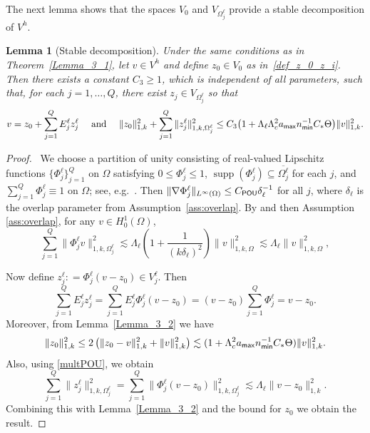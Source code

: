 \documentclass[numbers,webpdf,imaiai]{ima-authoring-template}%
\theoremstyle{thmstyletwo}%
\newtheorem{lemma}[theorem]{Lemma}
\numberwithin{equation}{section}
\newcommand{\CPOU}{C_{\textup{\textsf{POU}}}}
\newcommand{\Cstar}{C_{\ast}}
\newcommand{\assign}{\mathrel{\mathop:}=}
\numberwithin{equation}{section}
\DeclareMathOperator{\supp}{supp}
\newcommand{\amax}{a_{\textup{\textsf{max}}}}
\newcommand{\nmin}{n_{\textup{\textsf{min}}}}
\begin{document}
{The next lemma shows that the spaces $V_0$ and $V_{\Omega_j^\ell}$ provide a stable decomposition of $V^h$.

\begin{lemma}[Stable decomposition]
\label{lemma_3_3}
Under the same conditions as in Theorem~\ref{Lemma_3_1}, let $v \in V^h$ and define $z_0 \in V_0$ as in~\eqref{def_z_0_z_i}. 
Then there exists a constant $C_3\ge1$, which is independent of all parameters, such that,
for each $j = 1,\ldots,Q$, there exist $z_j \in V_{\Omega_j^\ell}$ so that
\[
	v = z_0 + \sum_{j=1}^Q E_j^\ell z_j^\ell \quad \text{ and } \quad \|z_0\|_{1,k}^2 + \sum_{j=1}^Q \|z_j^\ell\|_{1,k,\Omega^\ell_j}^2 
	\le C_3 \bigl(1 + \Lambda_\ell \Lambda_c^2 \amax \nmin^{-1} \Cstar \Theta \bigr) \| v \|_{1,k}^2.
\]
\end{lemma}

\begin{proof}\,
We choose a partition of unity consisting of real-valued Lipschitz functions $\{\Phi_j^{\ell}\}_{j=1}^Q$ on $\Omega$  
satisfying $0 \le \Phi_j^{\ell} \le 1$, $\supp(\Phi_j^{\ell}) \subseteq \overline{\Omega_j^\ell}$ for each $j$,
and $\sum_{j=1}^Q \Phi_j^{\ell} \equiv 1$ on $\Omega$; see, e.g.\ \cite[\S 3.2]{Toselli:2005:DDM}. 
Then $\|\nabla \Phi_j^{\ell}\|_{L^\infty(\Omega)} \le \CPOU \delta_\ell^{-1}$ for all $j$,
where $\delta_\ell$ is the overlap parameter from Assumption~\ref{ass:overlap}. 
By \cite[estimate (3.2)]{Graham:2020:DDI} and then Assumption \ref{ass:overlap}, for any $v \in H^1_0(\Omega)$,
\begin{equation}\label{multPOU}
	\sum_{j=1}^Q \| \Phi_j^{\ell} v \|_{1,k,\Omega_j^\ell}^2 
	\lesssim \Lambda_\ell \left(1 + \frac{1}{(k{\delta_\ell})^2} \right) \|v\|_{1,k,\Omega}^2 \lesssim \Lambda_\ell  \|v\|_{1,k,\Omega}^2,
\end{equation}


Now define $z_j^\ell \assign \Phi_j^\ell(v - z_0) \in V_j^\ell$.  Then 
\[
	\sum_{j=1}^Q E_j^\ell z_j^\ell = \sum_{j=1}^Q E_j^\ell \Phi_j^\ell (v - z_0) = (v - z_0)\sum_{j=1}^Q {\Phi_j^\ell} = v - z_0. 
\]
Moreover, from Lemma~\ref{Lemma_3_2} we have 
\[
	\|z_0\|_{1,k}^2 \le 2\left(\|z_0 - v\|_{1,k}^2 + \|v\|_{1,k}^2\right) \lesssim
	(1 + \Lambda_c^2 \amax \nmin^{-1} \Cstar \Theta) \|v\|_{1,k}^2.
\]
Also, using \eqref{multPOU}, we obtain
\[
	\sum_{j=1}^Q \|z_j^\ell\|_{1,k,\Omega_j^\ell}^2 
	= \sum_{j=1}^Q \| \Phi_j^\ell (v - z_0)\|_{1,k,\Omega_j^\ell}^2 
	\lesssim \Lambda_\ell \|v - z_0\|_{1,k}^2.
\]
Combining this with Lemma~\ref{Lemma_3_2} and the bound for \(z_0\) we obtain the result.
\end{proof}

}
\end{document}
